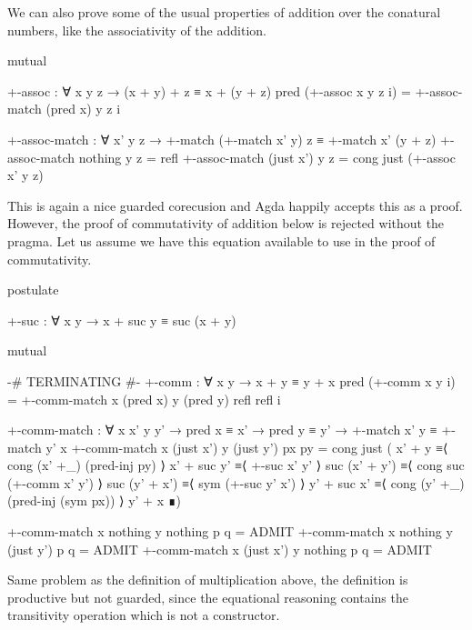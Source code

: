 We can also prove some of the usual properties of addition over the conatural
numbers, like the associativity of the addition.
\begin{code}[hide]
mutual
\end{code}
\begin{code}
  +-assoc : ∀ x y z → (x + y) + z ≡ x + (y + z)
  pred (+-assoc x y z i) = +-assoc-match (pred x) y z i

  +-assoc-match :
    ∀ x' y z →
    +-match (+-match x' y) z ≡ +-match x' (y + z)
  +-assoc-match nothing    y z = refl
  +-assoc-match (just x')  y z = cong just (+-assoc x' y z)
\end{code}
This is again a nice guarded corecusion and Agda happily accepts this as a
proof. However, the proof of commutativity of addition below is rejected without
the  pragma. Let us assume we have this equation
available to use in the proof of commutativity.
\begin{code}[hide]
postulate
\end{code}
\begin{code}
  +-suc : ∀ x y → x + suc y ≡ suc (x + y)
\end{code}

\begin{code}[hide]
mutual
\end{code}
\begin{code}
  {-# TERMINATING #-}
  +-comm : ∀ x y → x + y ≡ y + x
  pred (+-comm x y i) =
    +-comm-match x (pred x) y (pred y) refl refl i

  +-comm-match :
    ∀ x x' y y' → pred x ≡ x' → pred y ≡ y' →
    +-match x' y ≡ +-match y' x
  +-comm-match x (just x') y (just y') px py =
    cong just
      (  x' + y         ≡⟨ cong (x' +_) (pred-inj py) ⟩
         x' + suc y'    ≡⟨ +-suc x' y' ⟩
         suc (x' + y')  ≡⟨ cong suc (+-comm x' y') ⟩
         suc (y' + x')  ≡⟨ sym (+-suc y' x') ⟩
         y' + suc x'    ≡⟨ cong (y' +_) (pred-inj (sym px)) ⟩
         y' + x         ∎)
\end{code}
\begin{code}[hide]
  +-comm-match x nothing y nothing p q = ADMIT
  +-comm-match x nothing y (just y') p q = ADMIT
  +-comm-match x (just x') y nothing p q = ADMIT
\end{code}
Same problem as the definition of multiplication above, the definition is
productive but not guarded, since the equational reasoning contains the
transitivity operation which is not a constructor.
